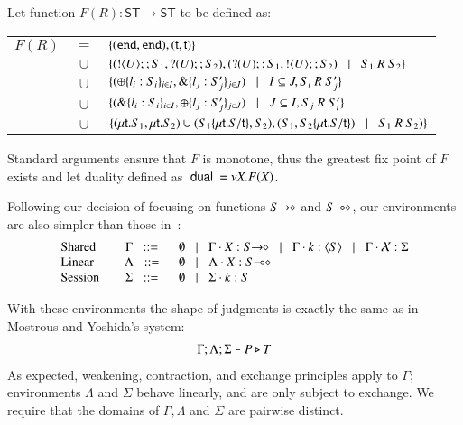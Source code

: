 \begin{definition}[Duality]
	Let function $F(R): \mathsf{ST} \longrightarrow \mathsf{ST}$ to be defined as:

	\begin{tabular}{rcl}
		$F(R)$ &$=$&		$\{(\mathtt{end}, \mathtt{end}), (\mathsf{t}, \mathsf{t})\}$\\
			&$\cup$&	$\{(! \langle U \rangle ;;S_1, ? (U) ;; S_2), (? (U) ;;S_1, ! \langle U \rangle ;; S_2) \;\;\;|\;\;\; S_1\ R\ S_2\}$\\
			&$\cup$&	$\{(\oplus \{l_i: S_i\}_{i \in I}, \& \{l_j: S_j'\}_{j \in J}) \;\;\;|\;\;\; I \subseteq J, S_i\ R\ S_j'\}$\\
			&$\cup$&	$\{(\& \{l_i: S_i\}_{i \in I}, \oplus \{l_j: S_j'\}_{j \in J}) \;\;\;|\;\;\; J \subseteq I, S_j\ R\ S_i'\}$\\
			&$\cup$&	$\{(\mu\mathsf{t}.S_1, \mu\mathsf{t}.S_2) \cup (S_1 \{\mu\mathsf{t}.S/\mathsf{t} \}, S_2), (S_1, S_2\{\mu\mathsf{t}.S/\mathsf{t} \}) \;\;\;|\;\;\; S_1\ R\ S_2)\}$
	\end{tabular}

	Standard arguments ensure that $F$ is monotone, thus the greatest fix point
	of $F$ exists and let duality defined as $\ \mathsf{dual}\  = \nu X. F(X)$.
\end{definition}


Following our decision of focusing on functions $S\!\! \rightarrow\!\! \diamond$ and $S\!\! \multimap\!\! \diamond$,
our environments are also simpler than those in~\cite{tlca07}:
\[
	\begin{array}{lcl}
		\text{Shared} & \Gamma \bnfis & \emptyset \bnfbar \Gamma \cat \varp{X}: \shot{S} \bnfbar \Gamma \cat k: \chtype{S} \bnfbar \Gamma \cat \rvar{X}: \Sigma \\
		\text{Linear} & \Lambda \bnfis & \emptyset \bnfbar \Lambda \cat \varp{X}: \lhot{S}  \\
		\text{Session} \quad & \Sigma \bnfis & \emptyset \bnfbar \Sigma \cat k:S  
	\end{array}
\]


With these environments the shape of judgments is exactly the same as in Mostrous and Yoshida's system:
\[
	\begin{array}{c}
		\Gamma; \Lambda ; \Sigma \vdash P \triangleright T
	\end{array}
\]
As expected, weakening, contraction, and exchange principles apply to $\Gamma$;
environments $\Lambda$ and $\Sigma$ behave linearly, and are only subject to exchange.
We require that the domains of $\Gamma, \Lambda$ and $\Sigma$ are pairwise distinct.
\newcommand{\jrule}[3]{\displaystyle \trule{#3}~~\frac{#1 }{#2}}
\newcommand{\addenv}{\circ}

